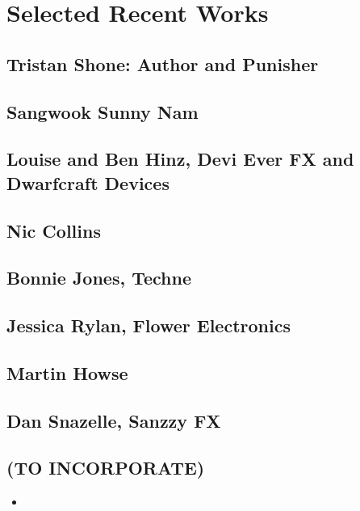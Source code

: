 \chapter{Selected Recent Works}\label{selrecworks}

\section{Tristan Shone: Author and Punisher}

\section{Sangwook Sunny Nam}

\section{Louise and Ben Hinz, Devi Ever FX and Dwarfcraft Devices}

\section{Nic Collins}

\section{Bonnie Jones, Techne}

\section{Jessica Rylan, Flower Electronics}

\section{Martin Howse}

\section{Dan Snazelle, Sanzzy FX}


\begin{unsortedStuff}	
\section*{(TO INCORPORATE)}
	\begin{itemize}
		\item 
	\end{itemize}
\end{unsortedStuff}
		
\begin{optBlankSpace}
	\newpage
	\mbox{}
\end{optBlankSpace}

